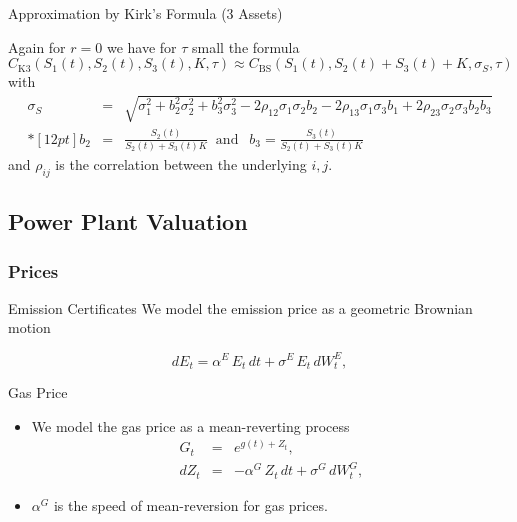 {Approximation by Kirk's Formula (3 Assets)}

Again for $r=0$ we have for  $\tau$ small the formula
{\small
\begin{equation}
 C_{\mbox{K3}}(S_1(t), S_2(t), S_3(t), K, \tau) \approx
 C_{\mbox{BS}}(S_1(t), S_2(t)+S_3(t)+K, \sigma_S, \tau)
\label{kirk3}
\end{equation}
with
 $$
 \begin{array}{lll}
 \sigma_S & = & \sqrt{\sigma_1^2+b_2^2\sigma_2^2 +b_3^2\sigma_3^2
 - 2\rho_{12}\sigma_1\sigma_2b_2 - 2\rho_{13}\sigma_1\sigma_3b_1 + 2\rho_{23}\sigma_2\sigma_3b_2b_3}\\*[12pt]
 b_2 &=& \frac{S_2(t)}{S_2(t)+S_3(t) K}
 \;\;\mbox{and}  \;\;\
  b_3 = \frac{S_3(t)}{S_2(t)+S_3(t) K}
\end{array}$$
}
and $\rho_{ij}$ is the correlation between the underlying $i,j$.





\subsection{Power Plant Valuation}
\subsubsection{Prices}

{ Emission Certificates}
We model the emission price as a geometric Brownian motion

\begin{equation}
d{E}_t = \alpha^E\,E_t\,d{t} + \sigma^E\,E_t\,d{W}^E_t,
\label{co2}
\end{equation}


{Gas Price}
\begin{itemize}
\item We model the gas price as a mean-reverting process
\begin{eqnarray}
G_t & = & e^{g(t) + Z_t},  \nonumber \\
d{Z}_t & = & -\alpha^G\,Z_t\,d{t} + \sigma^G\,d{W}^G_t,
\label{gas}
\end{eqnarray}
\item $\alpha^G$ is the speed of mean-reversion for gas prices.
\end{itemize}


